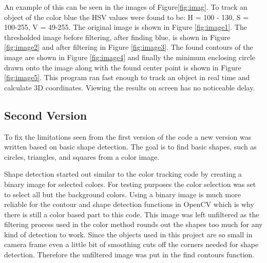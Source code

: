An example of this can be seen in the images of Figure\ref{fig:imag}. To track an object of the color blue the HSV values were found to be: H = 100 - 130, S = 100-255, V = 49-255. The original image is shown in Figure \ref{fig:image1}. The thresholded image before filtering, after finding blue, is shown in Figure \ref{fig:image2} and after filtering in Figure \ref{fig:image3}. The found contours of the image are shown in Figure \ref{fig:image4} and finally the minimum enclosing circle drawn onto the image along with the found center point is shown in Figure \ref{fig:image5}. This program ran fast enough to track an object in real time and calculate 3D coordinates. Viewing the results on screen has no noticeable delay.


\subsection{Second Version}
To fix the limitations seen from the first version of the code a new version was written based on basic shape detection. The goal is to find basic shapes, such as circles, triangles, and squares from a color image. 

Shape detection started out similar to the color tracking code by creating a binary image for selected colors. For testing purposes the color selection was set to select all but the background colors. Using a binary image is much more reliable for the contour and shape detection functions in OpenCV which is why there is still a color based part to this code. This image was left unfiltered as the filtering process used in the color method rounds out the shapes too much for any kind of detection to work. Since the objects used in this project are so small in camera frame even a little bit of smoothing cuts off the corners needed for shape detection. Therefore the unfiltered image was put in the find contours function.

